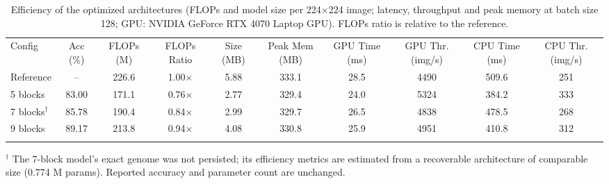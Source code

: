 \begin{table}[t]
\caption{Efficiency of the optimized architectures (FLOPs and model size per 224$\times$224 image; latency, throughput and peak memory at batch size 128; GPU: NVIDIA GeForce RTX 4070 Laptop GPU). FLOPs ratio is relative to the reference.}
\label{tab:hpo_efficiency}
\begin{tabular*}{\hsize}{@{\extracolsep{\fill}}lccccccccc@{}}
\toprule
Config & Acc (\%) & FLOPs (M) & FLOPs Ratio & Size (MB) & Peak Mem (MB) & GPU Time (ms) & GPU Thr. (img/s) & CPU Time (ms) & CPU Thr. (img/s) \\
\colrule
Reference & -- & 226.6 & 1.00$\times$ & 5.88 & 333.1 & 28.5 & 4490 & 509.6 & 251 \\
5 blocks & 83.00 & 171.1 & 0.76$\times$ & 2.77 & 329.4 & 24.0 & 5324 & 384.2 & 333 \\
7 blocks$^{\dagger}$ & 85.78 & 190.4 & 0.84$\times$ & 2.99 & 329.7 & 26.5 & 4838 & 478.5 & 268 \\
9 blocks & 89.17 & 213.8 & 0.94$\times$ & 4.08 & 330.8 & 25.9 & 4951 & 410.8 & 312 \\
\botrule
\end{tabular*}
\vspace{2pt}
{\footnotesize $^{\dagger}$ The 7-block model's exact genome was not persisted; its efficiency metrics are estimated from a recoverable architecture of comparable size (0.774 M params). Reported accuracy and parameter count are unchanged.\par}
\end{table}
